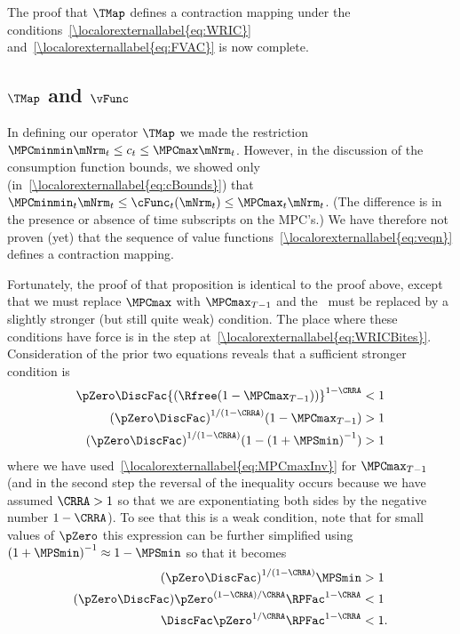 \documentclass[\econtexRoot/BufferStockTheory]{subfiles}
\begin{document}
The proof that $\TMap$ defines a contraction mapping under the
conditions~\eqref{\localorexternallabel{eq:WRIC}} and~\eqref{\localorexternallabel{eq:FVAC}} is
now complete.

\subsection{
  \texorpdfstring{$\TMap$}{T} and \texorpdfstring{$\vFunc$}{v}}

In defining our operator $\TMap$ we made the restriction
$\MPCminmin \mNrm_{t} \leq c_{t} \leq \MPCmax \mNrm_{t}$.  However,
in the discussion of the consumption function bounds, we
showed only (in~\eqref{\localorexternallabel{eq:cBounds}}) that $\MPCminmin_{t} \mNrm_{t} \leq \cFunc_{t}(\mNrm_{t})
\leq \MPCmax_{t} \mNrm_{t}$.  (The difference is in the presence
or absence of time subscripts on the MPC's.)
  We have therefore
not proven (yet) that the sequence of value functions~\eqref{\localorexternallabel{eq:veqn}} defines a contraction mapping.

Fortunately, the proof of that proposition is identical to the proof above, except that we must replace
$\MPCmax$ with $\MPCmax_{T-1}$ and the \WRIC~must be
replaced by a slightly stronger (but still quite weak) condition.  The place where these
conditions have force is in the step at~\eqref{\localorexternallabel{eq:WRICBites}}.
Consideration of the prior two equations reveals that
a sufficient stronger condition is
\begin{align*}
    \pZero \DiscFac {(\Rfree (1-\MPCmax_{T-1}))}^{1-\CRRA}  & < 1
\\  {(\pZero \DiscFac)}^{1/(1-\CRRA)}  (1-\MPCmax_{T-1})  & > 1
\\  {(\pZero \DiscFac)}^{1/(1-\CRRA)}  (1-{(1+\MPSmin)}^{-1})  & > 1
\end{align*}
where we have used~\eqref{\localorexternallabel{eq:MPCmaxInv}} for $\MPCmax_{T-1}$ (and in the second step the reversal of the inequality occurs because we have assumed $\CRRA > 1$ so that we are exponentiating both sides by the negative number $1-\CRRA$).  To see that this is a weak condition, note that for small values of
$\pZero$ this expression can be further simplified using ${(1+\MPSmin)}^{-1}
\approx 1-\MPSmin$ so that it becomes
\begin{align*}
  {(\pZero \DiscFac)}^{1/(1-\CRRA)}  \MPSmin  & > 1
\\  (\pZero \DiscFac)  \pZero^{(1-\CRRA)/\CRRA} \RPFac^{1-\CRRA}  & < 1
\\  \DiscFac  \pZero^{1/\CRRA} \RPFac^{1-\CRRA}  & < 1.
\end{align*}
\end{document}
